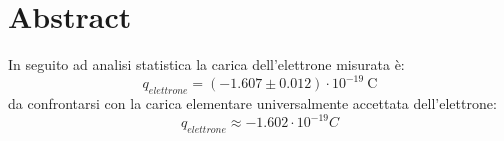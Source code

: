 \section{Abstract}    
\normalsize
    In seguito ad analisi statistica la carica dell'elettrone misurata è:
        $$q_{elettrone} = \left(-1.607\pm0.012\right)\cdot10^{-19}~\mathrm{C}$$
    da confrontarsi con la carica elementare universalmente accettata dell'elettrone: 
        $$q_{elettrone}\approx-1.602\cdot10^{-19} C$$